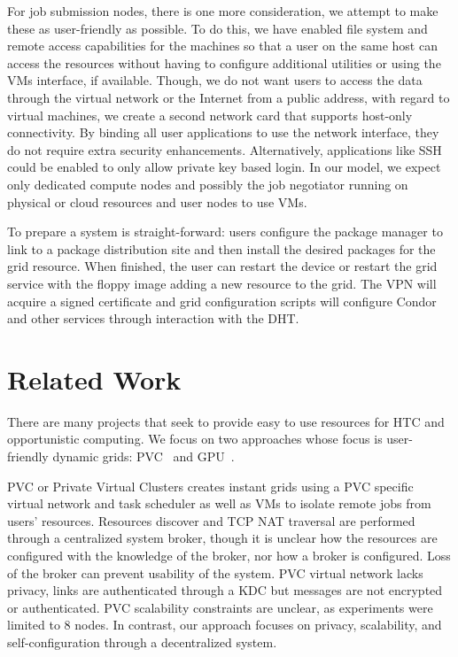 \documentclass{sig-alternate}
\begin{document}
For job submission nodes, there is one more consideration, we attempt to make
these as user-friendly as possible.  To do this, we have enabled file system
and remote access capabilities for the machines so that a user on the same
host can access the resources without having to configure additional utilities
or using the VMs interface, if available.  Though, we do not want users to
access the data through the virtual network or the Internet from a public
address, with regard to virtual machines, we create a second network card that
supports host-only connectivity.  By binding all user applications to use the
network interface, they do not require extra security enhancements.
Alternatively, applications like SSH could be enabled to only allow private key
based login.  In our model, we expect only dedicated compute nodes and possibly
the job negotiator running on physical or cloud resources and user nodes to
use VMs.

To prepare a system is straight-forward: users configure the package manager to
link to a package distribution site and then install the desired packages for
the grid resource.  When finished, the user can restart the device or restart
the grid service with the floppy image adding a new resource to the grid.  The
VPN will acquire a signed certificate and grid configuration scripts will
configure Condor and other services through interaction with the DHT.

\section{Related Work}
\label{related_work}
There are many projects that seek to provide easy to use resources for HTC
and opportunistic computing.  We focus on two approaches whose focus is
user-friendly dynamic grids: PVC~\cite{pvc} and GPU~\cite{gpu}.

PVC or Private Virtual Clusters creates instant grids using a PVC specific
virtual network and task scheduler as well as VMs to isolate remote jobs from
users' resources.  Resources discover and TCP NAT traversal are performed
through a centralized system broker, though it is unclear how the resources are
configured with the knowledge of the broker, nor how a broker is configured.
Loss of the broker can prevent usability of the system.  PVC virtual network
lacks privacy, links are authenticated through a KDC but messages are not
encrypted or authenticated.  PVC scalability constraints are unclear, as
experiments were limited to 8 nodes.  In contrast, our approach focuses on
privacy, scalability, and self-configuration through a decentralized system.
\end{document}
